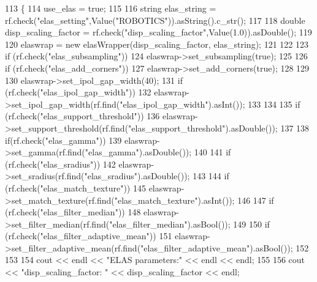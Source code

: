 \begin{DoxyCode}
113 \{
114     use\_elas = \textcolor{keyword}{true};
115 
116     \textcolor{keywordtype}{string} elas\_string = rf.check(\textcolor{stringliteral}{"elas\_setting"},Value(\textcolor{stringliteral}{"ROBOTICS"})).asString().c\_str();
117 
118     \textcolor{keywordtype}{double} disp\_scaling\_factor = rf.check(\textcolor{stringliteral}{"disp\_scaling\_factor"},Value(1.0)).asDouble();
119 
120     elaswrap = \textcolor{keyword}{new} elasWrapper(disp\_scaling\_factor, elas\_string);
121 
122     
123     \textcolor{keywordflow}{if} (rf.check(\textcolor{stringliteral}{"elas\_subsampling"}))
124         elaswrap->set\_subsampling(\textcolor{keyword}{true});
125 
126     \textcolor{keywordflow}{if} (rf.check(\textcolor{stringliteral}{"elas\_add\_corners"}))
127         elaswrap->set\_add\_corners(\textcolor{keyword}{true});
128 
129 
130     elaswrap->set\_ipol\_gap\_width(40);
131     \textcolor{keywordflow}{if} (rf.check(\textcolor{stringliteral}{"elas\_ipol\_gap\_width"}))
132         elaswrap->set\_ipol\_gap\_width(rf.find(\textcolor{stringliteral}{"elas\_ipol\_gap\_width"}).asInt());
133 
134 
135     \textcolor{keywordflow}{if} (rf.check(\textcolor{stringliteral}{"elas\_support\_threshold"}))
136         elaswrap->set\_support\_threshold(rf.find(\textcolor{stringliteral}{"elas\_support\_threshold"}).asDouble());
137 
138     \textcolor{keywordflow}{if}(rf.check(\textcolor{stringliteral}{"elas\_gamma"}))
139         elaswrap->set\_gamma(rf.find(\textcolor{stringliteral}{"elas\_gamma"}).asDouble());
140 
141     \textcolor{keywordflow}{if} (rf.check(\textcolor{stringliteral}{"elas\_sradius"}))
142         elaswrap->set\_sradius(rf.find(\textcolor{stringliteral}{"elas\_sradius"}).asDouble());
143 
144     \textcolor{keywordflow}{if} (rf.check(\textcolor{stringliteral}{"elas\_match\_texture"}))
145         elaswrap->set\_match\_texture(rf.find(\textcolor{stringliteral}{"elas\_match\_texture"}).asInt());
146 
147     \textcolor{keywordflow}{if} (rf.check(\textcolor{stringliteral}{"elas\_filter\_median"}))
148         elaswrap->set\_filter\_median(rf.find(\textcolor{stringliteral}{"elas\_filter\_median"}).asBool());
149 
150     \textcolor{keywordflow}{if} (rf.check(\textcolor{stringliteral}{"elas\_filter\_adaptive\_mean"}))
151         elaswrap->set\_filter\_adaptive\_mean(rf.find(\textcolor{stringliteral}{"elas\_filter\_adaptive\_mean"}).asBool());
152 
153 
154     cout << endl << \textcolor{stringliteral}{"ELAS parameters:"} << endl << endl;
155 
156     cout << \textcolor{stringliteral}{"disp\_scaling\_factor: "} << disp\_scaling\_factor << endl;

\end{DoxyCode}
